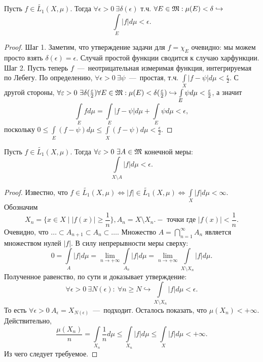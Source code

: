 \begin{theorem}
    Пусть $f \in \widetilde{L_1}(X, \mu)$. Тогда $\forall \epsilon > 0 \ \exists \delta(\epsilon)$ т.ч. $\forall E \in \mathfrak{M} : \mu(E) < \delta \hookrightarrow$ \[\int\limits_{E} |f|d\mu < \epsilon.\]
\end{theorem}
\begin{proof}
    Шаг 1. Заметим, что утверждение задачи для $f = \chi_E$ очевидно: мы можем просто взять $\delta(\epsilon) = \epsilon$. Случай простой функции сводится к случаю харфункции. \\
    Шаг 2. Пусть теперь $f$~---~неотрицательная измеримая функция, интегрируемая по Лебегу. По определению, $\forall \epsilon > 0 \  \exists \psi$~---~простая, т.ч. $\int\limits_X |f - \psi| d\mu < \frac{\epsilon}{2}$. С другой стороны, $\forall \epsilon > 0 \ \exists \delta(\frac{\epsilon}{2}) \forall E \in \MM: \mu(E) < \delta(\frac{\epsilon}{2}) \hookrightarrow \int\limits_E \psi d\mu < \frac{\epsilon}{2}$, а значит \[\int\limits_E fd\mu = \int\limits_{E} |f - \psi|  d\mu + \int\limits_E \psi d\mu < \epsilon,\]
     поскольку $0 \leq \int\limits_{E}(f - \psi)d\mu \leq \int\limits_{X}(f - \psi)d\mu < \frac{\epsilon}{2}$.
\end{proof}

\begin{proposition}
    Пусть $f \in \widetilde{L_1}(X, \mu)$. Тогда $\forall \varepsilon > 0 \ \exists A \in \mathfrak{M}$ конечной меры: \[\int\limits_{X \setminus A} |f|d\mu < \epsilon.\]
\end{proposition}
\begin{proof}
    Известно, что $f \in \widetilde{L_1}(X, \mu) \Longleftrightarrow |f| \in \widetilde{L_1}(X, \mu) \Longleftrightarrow \int\limits_X |f|d\mu < \infty$. Обозначим \[X_n = \{x \in X \mid |f(x)| \geq \frac{1}{n}\}, A_n = X\setminus X_n. - \text{ точки где } |f(x)| < \frac{1}{n}.\]
    Очевидно, что $\ldots \subset A_{n + 1} \subset A_n \subset \ldots$. Множество $A = \bigcap\limits_{n = 1}^\infty A_n$ является множеством нулей $|f|$. В силу непрерывности меры сверху: \[0 = \int\limits_A |f|d\mu = \lim\limits_{n \rightarrow +\infty} \int\limits_{A_n} |f|d\mu = \lim\limits_{n \rightarrow +\infty} \int\limits_{X \setminus X_n} |f|d\mu.\]
    Полученное равенство, по сути и доказывает утверждение: \[\forall \epsilon > 0  \ \exists N(\epsilon): \ \forall n \geq N \hookrightarrow \int\limits_{X \setminus X_n} |f|d\mu < \epsilon.\]
    То есть $\forall \epsilon > 0 \  A_\epsilon = X_{N(\epsilon)}$~---~подходит. Осталось показать, что $\mu(X_n) < +\infty$. Действительно, \[\frac{\mu(X_n)}{n} = \int\limits_{X_n} \frac{1}{n}d\mu \leq \int\limits_{X_n} |f|d\mu \leq \int\limits_{X} |f|d\mu < +\infty.\]
    Из чего следует требуемое.
\end{proof}

